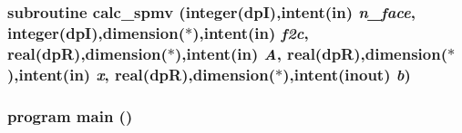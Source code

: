 \label{test_2ftest_8f90_a638fb93022b93255d8000bacff09a674}
\hypertarget{test_2ftest_8f90_a5595358e7ada913cd10a206235165422}{
\subsubsection[{calc\_\-spmv}]{\setlength{\rightskip}{0pt plus 5cm}subroutine calc\_\-spmv (integer(dpI),intent(in) {\em n\_\-face}, \/  integer(dpI),dimension($\ast$),intent(in) {\em f2c}, \/  real(dpR),dimension($\ast$),intent(in) {\em A}, \/  real(dpR),dimension($\ast$),intent(in) {\em x}, \/  real(dpR),dimension($\ast$),intent(inout) {\em b})}}
\label{test_2ftest_8f90_a5595358e7ada913cd10a206235165422}
\hypertarget{test_2ftest_8f90_a8ec2266d83cd6c0b762cbcbc92c0af3d}{
\subsubsection[{main}]{\setlength{\rightskip}{0pt plus 5cm}program main ()}}
\label{test_2ftest_8f90_a8ec2266d83cd6c0b762cbcbc92c0af3d}
